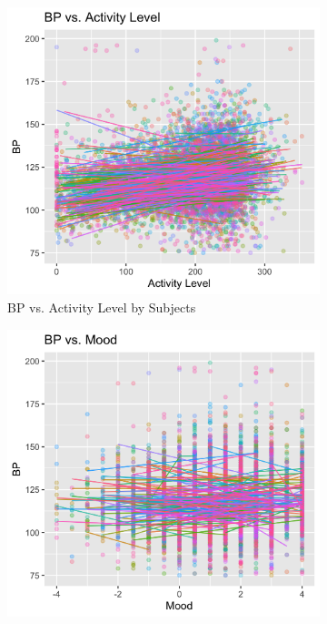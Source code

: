 \documentclass[12pt,twoside,leqno,fleqn,letterpaper]{article}
\theoremstyle{definition}
\theoremstyle{definition}
\begin{document}
\begin{figure}
    \centering
    \begin{subfigure}[b]{0.29\textwidth}
    \centering
    \includegraphics[width=\textwidth]{pics/bp v act.png}
    \caption[]%
    {{\small BP vs. Activity Level by Subjects}}
    \label{fig: bp v act}
    \end{subfigure}
    \hfill
    \begin{subfigure}[b]{0.29\textwidth}
    \centering
    \includegraphics[width=\textwidth]{pics/bp v mood.png}

\end{subfigure}
\end{figure}
\end{document}
